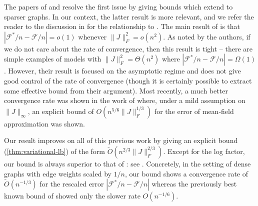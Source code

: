\documentclass[final, 12pt]{colt2018}
\newcommand{\F}{\mathcal{F}}
\theoremstyle{definition}
\theoremstyle{plain}
\begin{document}
The papers of \citep{borgs2014p} and \citep{basak2017universality} resolve the first issue by giving bounds which extend to sparser graphs. In our context, the latter result is more relevant, and we refer the reader to the discussion in \citep{basak2017universality}
for the relationship to \citep{borgs2014p}. The main result of \citep{basak2017universality}
is that $|\F^*/n - \F/n| = o(1)$ whenever $\|J\|_F^2 = o(n^2)$. 
As noted by the authors, if we do not
care about the rate of convergence, then this result is tight -- there are simple
examples of models with $\|J\|_F^2 = \Theta(n^2)$ where $|\F^*/n - \F/n| = \Omega(1)$.
However, their result is focused
on the asymptotic regime and does not give good control of the rate of convergence (though it is certainly possible to extract some effective bound from their argument). Most recently, a much better convergence rate was shown in the work of \citep{eldan2016gaussian} where, under a mild assumption on $\|J\|_{\infty}$, an explicit bound of $O(n^{5/6} \|J\|_F^{1/3})$ for the error of mean-field approximation was shown. 

Our result improves on all of this previous work by giving an explicit bound (\cref{thm:variational-lb}) of the form $\tilde{O}(n^{2/3} \|J\|_F^{2/3})$. Except for the log factor, our bound is always superior to that of \citep{eldan2016gaussian}: see . Concretely, in the setting of dense graphs with edge weights scaled by $1/n$, our bound shows a convergence rate of $\tilde{O}(n^{-1/3})$ for the rescaled error $|\mathcal{F}^*/n - \mathcal{F}/n|$
whereas the previously best known bound of \citep{eldan2016gaussian} showed only the slower rate $O(n^{-1/6})$.


\end{document}
